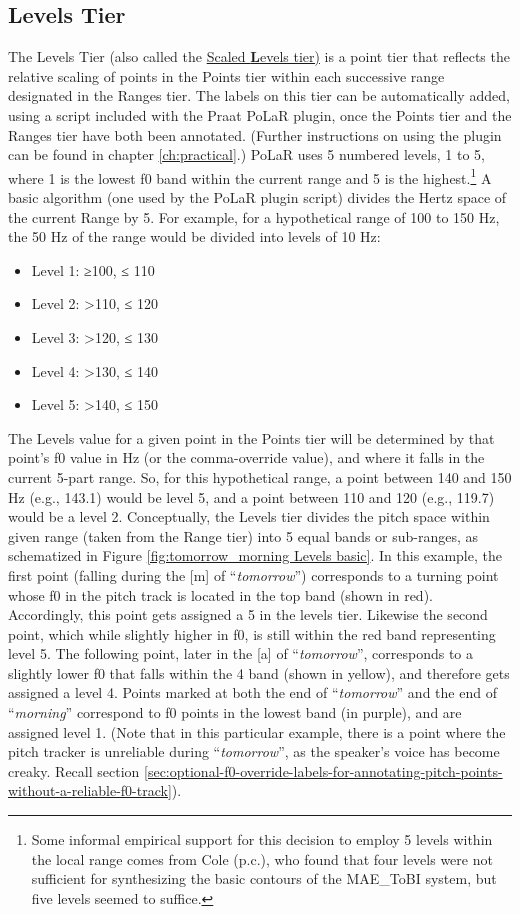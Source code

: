 \documentclass[11pt, twoside]{memoir}
\def\langtext#1{\textit{#1}}
\begin{document}
\subsection{Levels Tier}\label{sec:levels}
The Levels Tier (also called the \uline{Scaled \textbf{L}evels tier)} is a point tier that reflects the relative scaling of points in the Points tier within each successive range designated in the Ranges tier. The labels on this tier can be automatically added, using a script included with the Praat PoLaR plugin, once the Points tier and the Ranges tier have both been annotated. (Further instructions on using the plugin can be found in chapter \ref{ch:practical}.)
PoLaR uses 5 numbered levels, 1 to 5, where 1 is the lowest f0 band within the current range and 5 is the highest.\footnote{Some informal empirical support for this decision to employ 5 levels within the local range comes from Cole (p.c.), who found that four levels were not sufficient for synthesizing the basic contours of the MAE\_ToBI system, but five levels seemed to suffice.} A basic algorithm (one used by the PoLaR plugin script) divides the Hertz space of the current Range by 5. For example, for a hypothetical range of 100 to 150 Hz, the 50 Hz of the range would be divided into levels of 10 Hz:
\begin{itemize}
\item Level 1: ≥100, ≤ 110
\item Level 2: >110, ≤ 120
\item Level 3: >120, ≤ 130
\item Level 4: >130, ≤ 140
\item Level 5: >140, ≤ 150 \end{itemize}
The Levels value for a given point in the Points tier will be determined by that point’s f0 value in Hz (or the comma-override value), and where it falls in the current 5-part range. So, for this hypothetical range, a point between 140 and 150 Hz (e.g., 143.1) would be level 5, and a point between 110 and 120 (e.g., 119.7) would be a level 2.
Conceptually, the Levels tier divides the pitch space within given range (taken from the Range tier) into 5 equal bands or sub-ranges, as schematized in Figure \ref{fig:tomorrow_morning Levels basic}. In this example, the first point (falling during the [m] of “\langtext{tomorrow}”) corresponds to a turning point whose f0 in the pitch track is located in the top band (shown in red). Accordingly, this point gets assigned a 5 in the levels tier. Likewise the second point, which while slightly higher in f0, is still within the red band representing level 5. The following point, later in the [a] of “\langtext{tomorrow}”, corresponds to a slightly lower f0 that falls within the 4 band (shown in yellow), and therefore gets assigned a level 4. Points marked at both the end of “\langtext{tomorrow}” and the end of “\langtext{morning}” correspond to f0 points in the lowest band (in purple), and are assigned level 1. (Note that in this particular example, there is a point where the pitch tracker is unreliable during “\langtext{tomorrow}”, as the speaker’s voice has become creaky. Recall section \ref{sec:optional-f0-override-labels-for-annotating-pitch-points-without-a-reliable-f0-track}).
\end{document}
